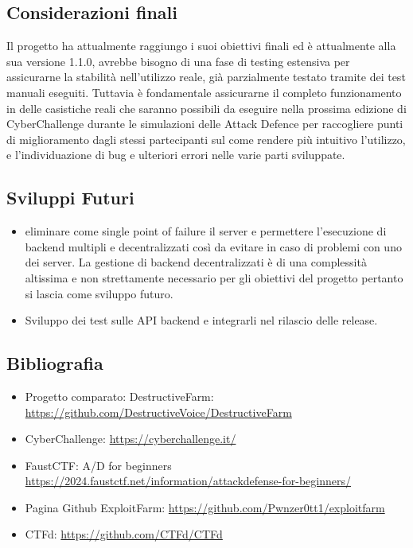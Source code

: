\documentclass[11pt]{article}
\begin{document}
\subsection{Considerazioni finali}
Il progetto ha attualmente raggiungo i suoi obiettivi finali ed è attualmente alla sua versione 1.1.0, avrebbe bisogno di una fase di testing estensiva per assicurarne la stabilità nell'utilizzo reale, già parzialmente testato tramite dei test manuali eseguiti. Tuttavia è fondamentale assicurarne il completo funzionamento in delle casistiche reali che saranno possibili da eseguire nella prossima edizione di CyberChallenge durante le simulazioni delle Attack Defence per raccogliere punti di miglioramento dagli stessi partecipanti sul come rendere più intuitivo l'utilizzo, e l'individuazione di bug e ulteriori errori nelle varie parti sviluppate.
\subsection{Sviluppi Futuri}
\begin{itemize}
	\item eliminare come single point of failure il server e permettere l'esecuzione di backend multipli e decentralizzati così da evitare in caso di problemi con uno dei server. La gestione di backend decentralizzati è di una complessità altissima e non strettamente necessario per gli obiettivi del progetto pertanto si lascia come sviluppo futuro.
	\item Sviluppo dei test sulle API backend e integrarli nel rilascio delle release.
\end{itemize}
\subsection{Bibliografia}
\begin{itemize}
	\item Progetto comparato: DestructiveFarm: \href{https://github.com/DestructiveVoice/DestructiveFarm}{https://github.com/DestructiveVoice/DestructiveFarm}
	\item CyberChallenge: \href{https://cyberchallenge.it/}{https://cyberchallenge.it/}
	\item FaustCTF: A/D for beginners \href{https://2024.faustctf.net/information/attackdefense-for-beginners/}{https://2024.faustctf.net/information/attackdefense-for-beginners/}
	\item Pagina Github ExploitFarm: \href{https://github.com/Pwnzer0tt1/exploitfarm}{https://github.com/Pwnzer0tt1/exploitfarm}
	\item CTFd: \href{https://github.com/CTFd/CTFd}{https://github.com/CTFd/CTFd}
\end{itemize}
\end{document}
